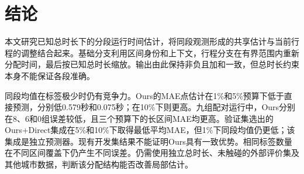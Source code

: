 \section{结论}
本文研究已知总时长下的分段运行时间估计，将同段观测形成的共享估计与当前行程的调整结合起来。基础分支利用区间身份和上下文，行程分支在有界范围内重新分配时间，最后按已知总时长缩放。输出由此保持非负且加和一致，但总时长约束本身不能保证各段准确。

同段均值在标签极少时仍有竞争力。Ours的MAE点估计在1\%和5\%预算下低于直接预测，分别低0.579秒和0.075秒；在10\%下则更高。九组配对运行中，Ours分别在8、6和0组误差较低，且三个预算下的长区间MAE均更高。验证集选出的Ours+Direct集成在5\%和10\%下取得最低平均MAE，但1\%下同段均值仍更低；该集成是独立预测器。现有开发集结果不能证明Ours具有一致优势。相同标签数量在不同区间覆盖下仍产生不同误差。仍需使用独立总时长、未触碰的外部评价集及其他城市数据，判断该分配结构能否改善局部估计。
